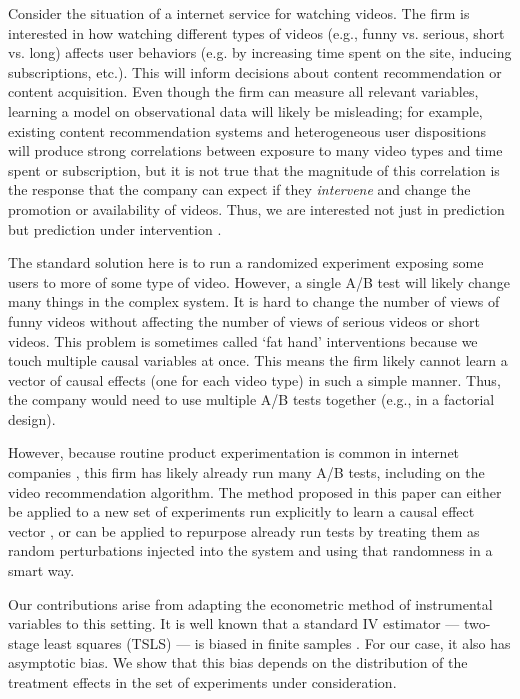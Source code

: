 \documentclass{article}
\begin{document}
Consider the situation of a internet service for watching videos. The firm is interested in how watching different types of videos (e.g., funny vs. serious, short vs. long) affects user behaviors (e.g. by increasing time spent on the site, inducing subscriptions, etc.). This will inform decisions about content recommendation or content acquisition. Even though the firm can measure all relevant variables, learning a model on observational data will likely be misleading; for example, existing content recommendation systems and heterogeneous user dispositions will produce strong correlations between exposure to many video types and time spent or subscription, but it is not true that the magnitude of this correlation is the response that the company can expect if they \textit{intervene} and change the promotion or availability of videos. Thus, we are interested not just in prediction but prediction under intervention \citep{bottou2013counterfactual, bottou2014machine, pearl2009causality}.

The standard solution here is to run a randomized experiment exposing some users to more of some type of video. However, a single A/B test will likely change many things in the complex system. It is hard to change the number of views of funny videos without affecting the number of views of serious videos or short videos. This problem is sometimes called `fat hand' interventions because we touch multiple causal variables at once. This means the firm likely cannot learn a vector of causal effects (one for each video type) in such a simple manner. Thus, the company would need to use multiple A/B tests together (e.g., in a factorial design). 

However, because routine product experimentation is common in internet companies \citep{bakshy2014www,varian2016intelligent,kohavi2013online}, this firm has likely already run many A/B tests, including on the video recommendation algorithm. The method proposed in this paper can either be applied to a new set of experiments run explicitly to learn a causal effect vector \citep[as in, e.g.,][]{eckles2016estimating}, or can be applied to repurpose already run tests by treating them as random perturbations injected into the system and using that randomness in a smart way. 

Our contributions arise from adapting the econometric method of instrumental variables \citep[IV;][]{wright1928tariff, reiersol1945confluence, angrist1996identification} to this setting. It is well known that a standard IV estimator --- two-stage least squares (TSLS) --- is biased in finite samples \citep{stock2012survey, angrist2008mostly}. For our case, it also has asymptotic bias. We show that this bias depends on the distribution of the treatment effects in the set of experiments under consideration.
\end{document}
